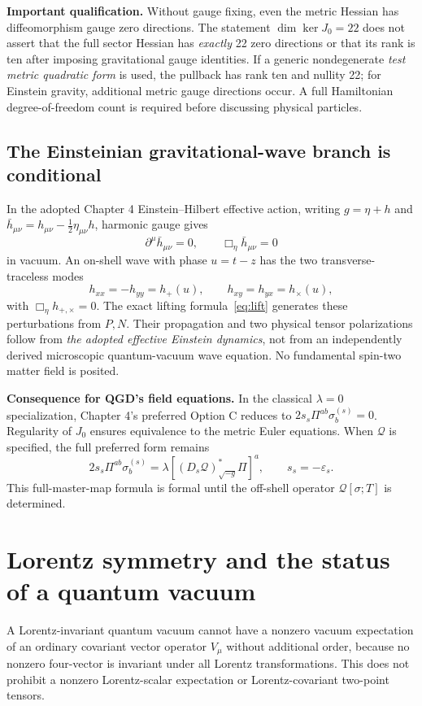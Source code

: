 \documentclass[11pt,a4paper]{article}
\theoremstyle{definition}\newtheorem{definition}[theorem]{Definition}
\theoremstyle{remark}\newtheorem{remark}[theorem]{Remark}
\newcommand{\kerop}{\operatorname{ker}}
\begin{document}
\textbf{Important qualification.} Without gauge fixing, even the metric Hessian has diffeomorphism gauge zero directions. The statement $\dim\kerop J_0=22$ does not assert that the full sector Hessian has \emph{exactly} 22 zero directions or that its rank is ten after imposing gravitational gauge identities. If a generic nondegenerate \emph{test metric quadratic form} is used, the pullback has rank ten and nullity 22; for Einstein gravity, additional metric gauge directions occur. A full Hamiltonian degree-of-freedom count is required before discussing physical particles.

\subsection{The Einsteinian gravitational-wave branch is conditional}
In the adopted Chapter 4 Einstein--Hilbert effective action, writing $g=\eta+h$ and $\bar h_{\mu\nu}=h_{\mu\nu}-\tfrac12\eta_{\mu\nu}h$, harmonic gauge gives
\begin{equation}\label{eq:wave}
\partial^\mu\bar h_{\mu\nu}=0,\qquad \Box_\eta\bar h_{\mu\nu}=0
\end{equation}
in vacuum. An on-shell wave with phase $u=t-z$ has the two transverse-traceless modes
\begin{equation}\label{eq:tt}
 h_{xx}=-h_{yy}=h_+(u),\qquad h_{xy}=h_{yx}=h_\times(u),
\end{equation}
with $\Box_\eta h_{+,\times}=0$. The exact lifting formula~\eqref{eq:lift} generates these perturbations from $P,N$. Their propagation and two physical tensor polarizations follow from \emph{the adopted effective Einstein dynamics}, not from an independently derived microscopic quantum-vacuum wave equation. No fundamental spin-two matter field is posited.

\textbf{Consequence for QGD's field equations.} In the classical $\lambda=0$ specialization, Chapter 4's preferred Option C reduces to $2s_s\Pi^{ab}\sigma_b^{(s)}=0$. Regularity of $J_0$ ensures equivalence to the metric Euler equations. When $\mathcal Q$ is specified, the full preferred form remains
\begin{equation}\label{eq:optionC}
\boxed{2s_s\Pi^{ab}\sigma_b^{(s)}=\lambda\left[(D_s\mathcal Q)^*_{\sqrt{-g}}\Pi\right]^a,\qquad s_s=-\varepsilon_s.}
\end{equation}
This full-master-map formula is formal until the off-shell operator $\mathcal Q[\sigma;T]$ is determined.

\section{Lorentz symmetry and the status of a quantum vacuum}
A Lorentz-invariant quantum vacuum cannot have a nonzero vacuum expectation of an ordinary covariant vector operator $V_\mu$ without additional order, because no nonzero four-vector is invariant under all Lorentz transformations. This does not prohibit a nonzero Lorentz-scalar expectation or Lorentz-covariant two-point tensors.
\end{document}
